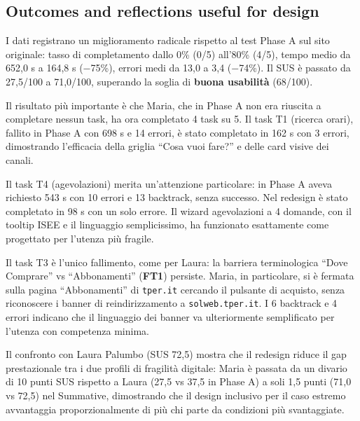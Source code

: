 ﻿\documentclass[11pt,a4paper]{article}
\begin{document}
\subsection*{Outcomes and reflections useful for design}
\begin{tcolorbox}[base]
I dati registrano un miglioramento radicale rispetto al test
Phase A sul sito originale: tasso di completamento dallo 0\%
(0/5) all'80\% (4/5), tempo medio da 652,0 s a 164,8 s
($-$75\%), errori medi da 13,0 a 3,4 ($-$74\%). Il SUS è
passato da 27,5/100 a 71,0/100, superando la soglia di
\textbf{buona usabilità} (68/100).

\medskip

Il risultato più importante è che Maria, che in Phase A non era
riuscita a completare nessun task, ha ora completato 4 task su 5.
Il task T1 (ricerca orari), fallito in Phase A con 698 s e 14
errori, è stato completato in 162 s con 3 errori, dimostrando
l'efficacia della griglia ``Cosa vuoi fare?'' e delle card
visive dei canali.

\medskip

Il task T4 (agevolazioni) merita un'attenzione particolare: in
Phase A aveva richiesto 543 s con 10 errori e 13 backtrack,
senza successo. Nel redesign è stato completato in 98 s con un
solo errore. Il wizard agevolazioni a 4 domande, con il tooltip
ISEE e il linguaggio semplicissimo, ha funzionato esattamente
come progettato per l'utenza più fragile.

\medskip

Il task T3 è l'unico fallimento, come per Laura: la barriera
terminologica ``Dove Comprare'' vs ``Abbonamenti'' (\textbf{FT1})
persiste. Maria, in particolare, si è fermata sulla pagina
``Abbonamenti'' di \texttt{tper.it} cercando il pulsante di
acquisto, senza riconoscere i banner di reindirizzamento a
\texttt{solweb.tper.it}. I 6 backtrack e 4 errori indicano
che il linguaggio dei banner va ulteriormente semplificato per
l'utenza con competenza minima.

\medskip

Il confronto con Laura Palumbo (SUS 72,5) mostra che il redesign
riduce il gap prestazionale tra i due profili di fragilità
digitale: Maria è passata da un divario di 10 punti SUS rispetto
a Laura (27,5 vs 37,5 in Phase A) a soli 1,5 punti (71,0 vs 72,5)
nel Summative, dimostrando che il design inclusivo per il caso
estremo avvantaggia proporzionalmente di più chi parte da
condizioni più svantaggiate.
\end{tcolorbox}
\end{document}
